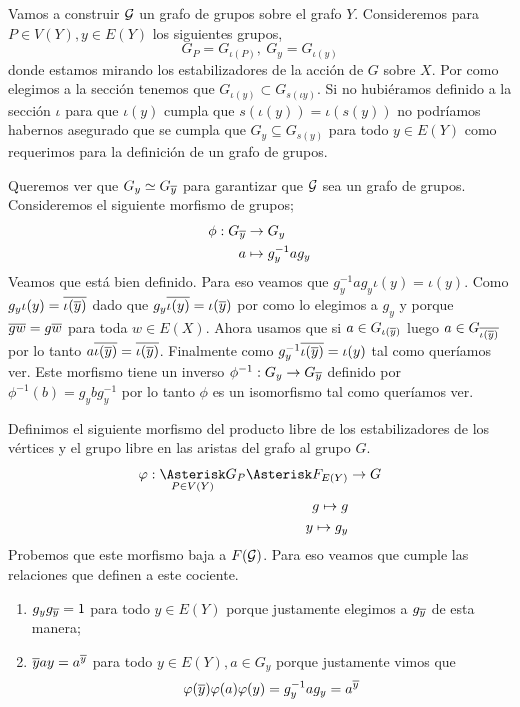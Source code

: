 \documentclass[tesis.tex]{subfiles}
\begin{document}
Vamos a construir ${\cal G}$ un grafo de grupos sobre el grafo $Y$.
Consideremos para $P \in V(Y), y \in E(Y)$ los siguientes grupos,
\[
	G_P = G_{\iota (P)}, \ G_y = G_{\iota(y)}
\]
donde estamos mirando los estabilizadores de la acción de $G$ sobre $X$.
Por como elegimos a la sección tenemos que $G_{\iota(y)} \subset G_{s(\iota y)}$.
Si no hubiéramos definido a la sección $\iota$ para que $\iota(y)$ cumpla que $s(\iota (y)) = \iota(s(y))$ no podríamos habernos asegurado que se cumpla que $G_{y} \subseteq G_{s(y)}$ para todo $y \in E(Y)$ como requerimos para la definición de un grafo de grupos.

Queremos ver que $G_{y} \simeq G_{\overline y}$ para garantizar que ${\cal G}$ sea un grafo de grupos.
Consideremos el siguiente morfismo de grupos;
\begin{align*}
	\phi: G_{\overline y} &\to G_{y} \\
	a &\mapsto g_{y}^{-1}ag_{y}
\end{align*}
Veamos que está bien definido. 
Para eso veamos que $g_{y}^{-1}ag_{y} \iota(y) = \iota(y)$.
Como $g_y \iota(y) = \overline{\iota(\overline y)}$ dado que $g_y \overline{\iota(y)} = \iota (\overline y)$ por como lo elegimos a $g_y$ y porque $\overline{gw} = g \overline w$ para toda $w \in E(X)$.
Ahora usamos que si $a \in G_{\iota({\overline y})}$ luego $a \in G_{\overline{\iota(\overline y)}}$ por lo tanto $a \overline{\iota(\overline y)} = \overline{\iota(\overline y)} $.
Finalmente como $ g_{y}^{-1} \overline {\iota (\overline y) } = \iota (y)$ tal como queríamos ver.
Este morfismo tiene un inverso $\phi^{-1}: G_{y} \to G_{\overline y}$ definido por $\phi^{-1}(b) = g_{y}bg_{y}^{-1}$ por lo tanto $\phi$ es un isomorfismo tal como queríamos ver.




Definimos el siguiente morfismo del producto libre de los estabilizadores de los vértices y el grupo libre en las aristas del grafo al grupo $G$.
\begin{align*}
	\varphi: \underset{P \in V(Y)}{\Asterisk} G_P \Asterisk F_{E(Y)} &\to G	\\
	g \mapsto g \\
	y \mapsto g_y \\
\end{align*}
Probemos que este morfismo baja a $F({\cal G})$. 
Para eso veamos que cumple las relaciones que definen a este cociente.
\begin{enumerate}
	\item $g_y g_{\overline y} = 1$ para todo $y \in E(Y)$ porque justamente elegimos a $g_{\overline y}$ de esta manera;
	\item $\overline y a y = a^{\overline y}$ para todo $y \in E(Y), a \in G_y$ porque justamente vimos que 
	\[
		\varphi(\overline y) \varphi (a) \varphi(y) = g_y^{-1}ag_y = a^{\overline y}
	\]
\end{enumerate}
\end{document}
